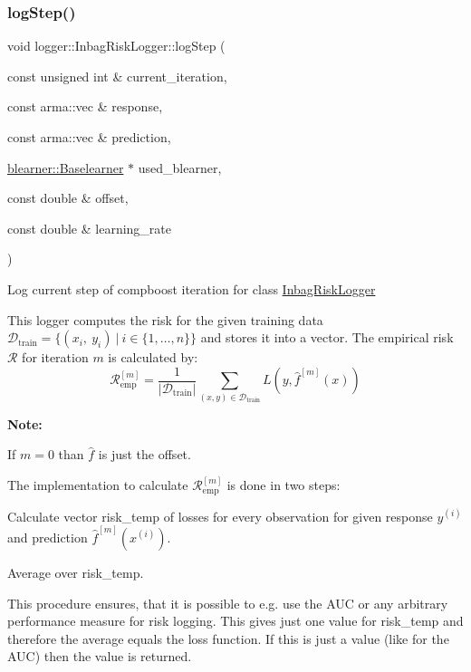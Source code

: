 \subsubsection{\texorpdfstring{log\+Step()}{logStep()}}
{\footnotesize\ttfamily void logger\+::\+Inbag\+Risk\+Logger\+::log\+Step (\begin{DoxyParamCaption}\item[{const unsigned int \&}]{current\+\_\+iteration,  }\item[{const arma\+::vec \&}]{response,  }\item[{const arma\+::vec \&}]{prediction,  }\item[{\hyperlink{classblearner_1_1_baselearner}{blearner\+::\+Baselearner} $\ast$}]{used\+\_\+blearner,  }\item[{const double \&}]{offset,  }\item[{const double \&}]{learning\+\_\+rate }\end{DoxyParamCaption})\hspace{0.3cm}{\ttfamily [virtual]}}



Log current step of compboost iteration for class {\ttfamily \hyperlink{classlogger_1_1_inbag_risk_logger}{Inbag\+Risk\+Logger}} 

This logger computes the risk for the given training data $\mathcal{D}_\mathrm{train} = \{(x_i,\ y_i)\ |\ i \in \{1, \dots, n\}\}$ and stores it into a vector. The empirical risk $\mathcal{R}$ for iteration $m$ is calculated by\+: \[ \mathcal{R}_\mathrm{emp}^{[m]} = \frac{1}{|\mathcal{D}_\mathrm{train}|}\sum\limits_{(x,y) \in \mathcal{D}_\mathrm{train}} L(y, \hat{f}^{[m]}(x)) \]

{\bfseries Note\+:}
\begin{DoxyItemize}
\item If $m=0$ than $\hat{f}$ is just the offset.
\item The implementation to calculate $\mathcal{R}_\mathrm{emp}^{[m]}$ is done in two steps\+:
\begin{DoxyEnumerate}
\item Calculate vector {\ttfamily risk\+\_\+temp} of losses for every observation for given response $y^{(i)}$ and prediction $\hat{f}^{[m]}(x^{(i)})$.
\item Average over {\ttfamily risk\+\_\+temp}.
\end{DoxyEnumerate}

This procedure ensures, that it is possible to e.\+g. use the A\+UC or any arbitrary performance measure for risk logging. This gives just one value for {\ttfamily risk\+\_\+temp} and therefore the average equals the loss function. If this is just a value (like for the A\+UC) then the value is returned.
\end{DoxyItemize}


